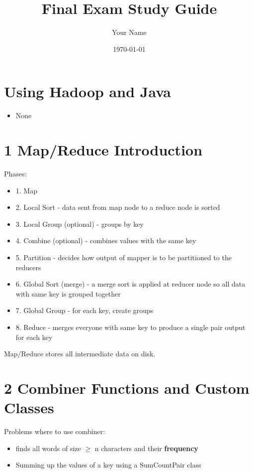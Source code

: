 \documentclass[12pt]{article}
\title{Final Exam Study Guide}
\author{Your Name}
\date{\today}
\begin{document}
\section*{Using Hadoop and Java}
\begin{itemize}
    \item None
\end{itemize}

\section*{1 Map/Reduce Introduction}
Phases:
\begin{itemize}
    \item 1. Map
    \item 2. Local Sort - data sent from map node to a reduce node is sorted
    \item 3. Local Group (optional) - groups by key
    \item 4. Combine (optional) - combines values with the same key
    \item 5. Partition - decides how output of mapper is to be partitioned 
    to the reducers
    \item 6. Global Sort (merge) - a merge sort is applied at reducer node so all
    data with same key is grouped together
    \item 7. Global Group - for each key, create groups
    \item 8. Reduce - merges everyone with same key to produce a single pair output
    for each key 
\end{itemize}

Map/Reduce stores all intermediate data on disk.

\section*{2 Combiner Functions and Custom Classes}
Problems where to use combiner:
\begin{itemize}
    \item finds all words of size $\geq$ n characters and their \textbf{frequency}
    \item Summing up the values of a key using a SumCountPair class
\end{itemize}
\end{document}
